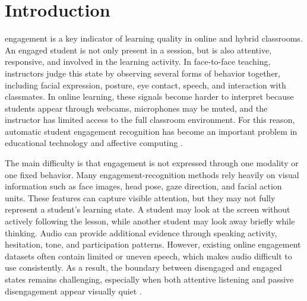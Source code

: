 \documentclass[journal]{IEEEtran}
\begin{document}
%
\IEEEpeerreviewmaketitle



\section{Introduction}

 engagement is a key indicator of learning quality in online and hybrid classrooms. An engaged student is not only present in a session, but is also attentive, responsive, and involved in the learning activity. In face-to-face teaching, instructors judge this state by observing several forms of behavior together, including facial expression, posture, eye contact, speech, and interaction with classmates. In online learning, these signals become harder to interpret because students appear through webcams, microphones may be muted, and the instructor has limited access to the full classroom environment. For this reason, automatic student engagement recognition has become an important problem in educational technology and affective computing \cite{qarbal2025review}.

The main difficulty is that engagement is not expressed through one modality or one fixed behavior. Many engagement-recognition methods rely heavily on visual information such as face images, head pose, gaze direction, and facial action units. These features can capture visible attention, but they may not fully represent a student's learning state. A student may look at the screen without actively following the lesson, while another student may look away briefly while thinking. Audio can provide additional evidence through speaking activity, hesitation, tone, and participation patterns. However, existing online engagement datasets often contain limited or uneven speech, which makes audio difficult to use consistently. As a result, the boundary between disengaged and engaged states remains challenging, especially when both attentive listening and passive disengagement appear visually quiet \cite{singh2023engagenet,wu2024cmose}.
\end{document}
